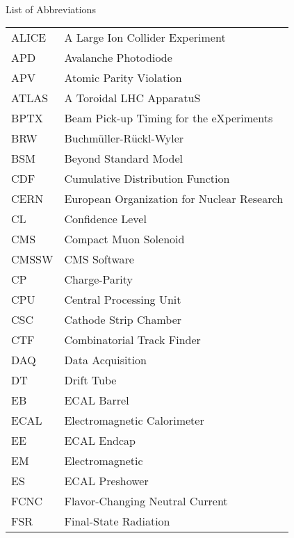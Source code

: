 
\renewcommand{\baselinestretch}{1}
\small\normalsize
\hbox{\ }

\vspace{-4em}

\begin{center}
\large{List of Abbreviations}
\end{center} 

\vspace{3pt}

\begin{longtable}[l]{@{}l@{\ \ \ \ \ \ \ \ \ \ \ \ }l}
ALICE      & A Large Ion Collider Experiment \\
APD        & Avalanche Photodiode \\
APV        & Atomic Parity Violation \\
ATLAS      & A Toroidal LHC ApparatuS \\
BPTX       & Beam Pick-up Timing for the eXperiments \\
BRW        & Buchm\"{u}ller-R\"{u}ckl-Wyler \\
BSM        & Beyond Standard Model \\
CDF        & Cumulative Distribution Function \\
CERN       & European Organization for Nuclear Research \\
CL         & Confidence Level \\
CMS        & Compact Muon Solenoid \\
CMSSW      & CMS Software \\
CP         & Charge-Parity \\
CPU        & Central Processing Unit \\
CSC        & Cathode Strip Chamber \\
CTF        & Combinatorial Track Finder \\
DAQ        & Data Acquisition \\
DT         & Drift Tube \\
EB         & ECAL Barrel \\
ECAL       & Electromagnetic Calorimeter \\
EE         & ECAL Endcap \\
EM         & Electromagnetic \\
ES         & ECAL Preshower \\
FCNC       & Flavor-Changing Neutral Current \\
FSR        & Final-State Radiation \\

\end{longtable}
